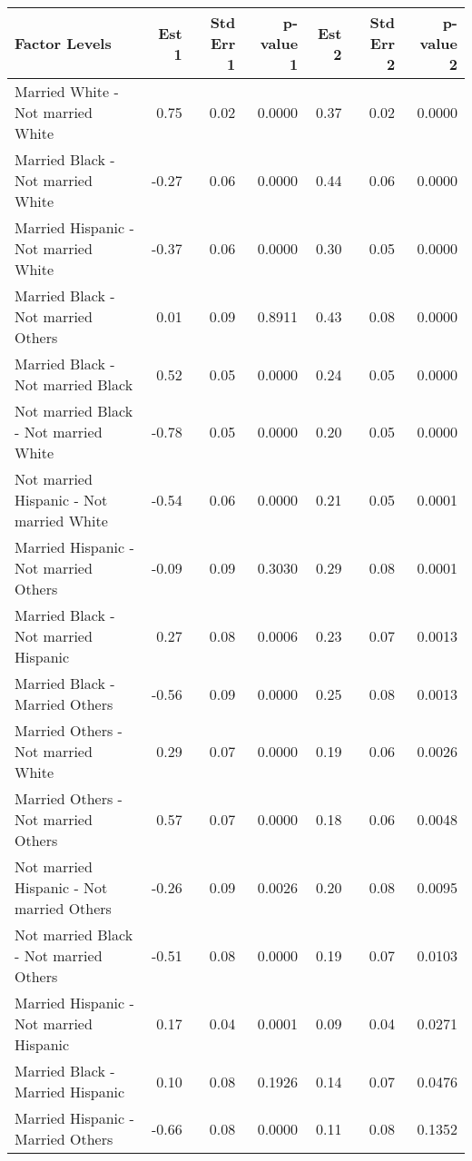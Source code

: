 \documentclass[11pt]{extarticle} %
\begin{document}
\begin{table}[H]
\footnotesize
\centering
\begin{tabular}{lrrrrrr}
  \hline
Factor Levels & Est 1 & Std Err 1 & p-value 1 & Est 2 & Std Err 2 & p-value 2 \\ 
  \hline
  Married White -  Not married White & 0.75 & 0.02 & 0.0000 & 0.37 & 0.02 & 0.0000 \\ 
    Married Black -  Not married White & -0.27 & 0.06 & 0.0000 & 0.44 & 0.06 & 0.0000 \\ 
    Married Hispanic -  Not married White & -0.37 & 0.06 & 0.0000 & 0.30 & 0.05 & 0.0000 \\ 
    Married Black -  Not married Others & 0.01 & 0.09 & 0.8911 & 0.43 & 0.08 & 0.0000 \\ 
    Married Black -  Not married Black & 0.52 & 0.05 & 0.0000 & 0.24 & 0.05 & 0.0000 \\ 
    Not married Black -  Not married White & -0.78 & 0.05 & 0.0000 & 0.20 & 0.05 & 0.0000 \\ 
    Not married Hispanic -  Not married White & -0.54 & 0.06 & 0.0000 & 0.21 & 0.05 & 0.0001 \\ 
    Married Hispanic -  Not married Others & -0.09 & 0.09 & 0.3030 & 0.29 & 0.08 & 0.0001 \\ 
    Married Black -  Not married Hispanic & 0.27 & 0.08 & 0.0006 & 0.23 & 0.07 & 0.0013 \\ 
    Married Black -  Married Others & -0.56 & 0.09 & 0.0000 & 0.25 & 0.08 & 0.0013 \\ 
    Married Others -  Not married White & 0.29 & 0.07 & 0.0000 & 0.19 & 0.06 & 0.0026 \\ 
    Married Others -  Not married Others & 0.57 & 0.07 & 0.0000 & 0.18 & 0.06 & 0.0048 \\ 
    Not married Hispanic -  Not married Others & -0.26 & 0.09 & 0.0026 & 0.20 & 0.08 & 0.0095 \\ 
    Not married Black -  Not married Others & -0.51 & 0.08 & 0.0000 & 0.19 & 0.07 & 0.0103 \\ 
    Married Hispanic -  Not married Hispanic & 0.17 & 0.04 & 0.0001 & 0.09 & 0.04 & 0.0271 \\ 
    Married Black -  Married Hispanic & 0.10 & 0.08 & 0.1926 & 0.14 & 0.07 & 0.0476 \\ 
    Married Hispanic -  Married Others & -0.66 & 0.08 & 0.0000 & 0.11 & 0.08 & 0.1352 \\ 

\end{tabular}
\end{table}
\end{document}
